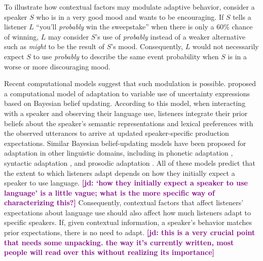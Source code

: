 \documentclass[man,floatsintext]{apa6}
\newcommand{\jd}[1]{\textcolor{Purple}{\bf [jd: #1]}}
\begin{document}
To illustrate how contextual factors may modulate adaptive behavior, consider a speaker $S$ who is in a very good mood and wants to be encouraging. If $S$ tells a listener $L$ ``you'll \textit{probably} win the sweepstake'' when there is only a 60\% chance of winning, $L$ may consider $S$'s use of \textit{probably} instead of a weaker alternative such as \textit{might} to be the result of $S$'s mood. Consequently, $L$ would not necessarily expect $S$ to use \textit{probably} to describe the same event probability when $S$ is in a worse or more discouraging mood.


Recent computational models suggest that such modulation is possible.   proposed a computational model of adaptation to variable use of uncertainty expressions based on Bayesian belief updating. According to this model, when interacting with a speaker and observing their language use, listeners integrate their prior beliefs about the speaker's semantic representations and lexical preferences with the observed utterances to arrive at updated speaker-specific production expectations. Similar Bayesian belief-updating models have been proposed for adaptation in other linguistic domains, including in phonetic adaptation \cite{Kleinschmidt2015}, syntactic adaptation \cite{Kleinschmidt2012}, and prosodic adaptation \cite{Roettger2019}. All of these models predict that the extent to which listeners adapt depends on how they initially expect a speaker to use language. \jd{`how they initially expect a speaker to use language' is a little vague; what is the more specific way of characterizing this?} Consequently, contextual factors that affect listeners' expectations about language use should also affect how much listeners adapt to specific speakers. If, given contextual information, a speaker's behavior matches prior expectations, there is no need to adapt. \jd{this is a very crucial point that needs some unpacking. the way it's currently written, most people will read over this without realizing its importance}
\end{document}
